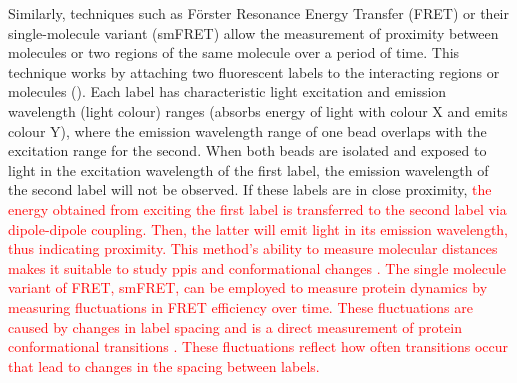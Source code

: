 Similarly, techniques such as Förster Resonance Energy Transfer (FRET) or their single-molecule variant (smFRET) allow the measurement of proximity between molecules or two regions of the same molecule over a period of time. This technique works by attaching two fluorescent labels to the interacting regions or molecules (). Each label has characteristic light excitation and emission wavelength (light colour) ranges (absorbs energy of light with colour X and emits colour Y), where the emission wavelength range of one bead overlaps with the excitation range for the second. When both beads are isolated and exposed to light in the excitation wavelength of the first label, the emission wavelength of the second label will not be observed. If these labels are in close proximity, \textcolor{red}{the energy obtained from exciting the first label is transferred to the second label via dipole-dipole coupling. Then, the latter will emit light in its emission wavelength, thus indicating proximity. This method's ability to measure molecular distances makes it suitable to study \glspl{ppi} and conformational changes \cite{truong_use_2001, heyduk_measuring_2002}.}
\textcolor{red}{The single molecule variant of FRET, smFRET, can be employed to measure protein dynamics by measuring fluctuations in FRET efficiency over time. These fluctuations are caused by changes in label spacing and is a direct measurement of protein conformational transitions \cite{weiss_measuring_2000}. These fluctuations reflect how often transitions occur that lead to changes in the spacing between labels.}

